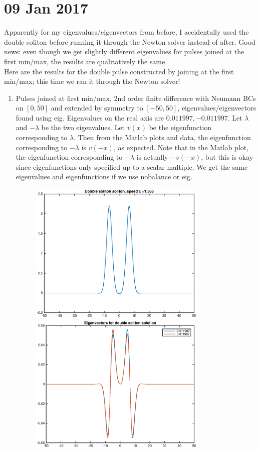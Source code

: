 \documentclass[12pt]{article}
\begin{document}
\section*{09 Jan 2017}

Apparently for my eigenvalues/eigenvectors from before, I accidentally used the double soliton before running it through the Newton solver instead of after. Good news: even though we get slightly different eigenvalues for pulses joined at the first min/max, the results are qualitatively the same. \\

Here are the results for the double pulse constructed by joining at the first min/max; this time we ran it through the Newton solver!

\begin{enumerate}
	\item Pulses joined at first min/max, 2nd order finite difference with Neumann BCs on $[0, 50]$ and extended by symmetry to $[-50, 50]$, eigenvalues/eigenvectors found using \textrm{eig}. Eigenvalues on the real axis are $0.011997, -0.011997$. Let $\lambda$ and $-\lambda$ be the two eigenvalues. Let $v(x)$ be the eigenfunction corresponding to $\lambda$. Then from the Matlab plots and data, the eigenfunction corresponding to $-\lambda$ is $v(-x)$, as expected. Note that in the Matlab plot, the eigenfunction corresponding to $-\lambda$ is actually $-v(-x)$, but this is okay since eigenfunctions only specified up to a scalar multiple. We get the same eigenvalues and eigenfunctions if we use \textrm{nobalance} or \textrm{eig}.

	\begin{figure}[H]
	\includegraphics[width=8.5cm]{double1_FD50.eps}
	\includegraphics[width=8.5cm]{double1_FD50_vec.eps}
	\end{figure}


\end{enumerate}
\end{document}
